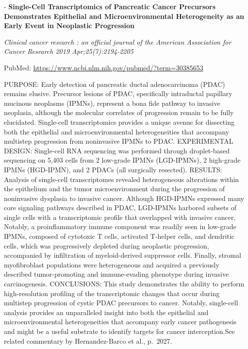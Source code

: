 \documentclass[]{article}
\begin{document}
 - \textbf{Single-Cell Transcriptomics of Pancreatic Cancer Precursors
Demonstrates Epithelial and Microenvironmental Heterogeneity as an Early
Event in Neoplastic Progression}

\emph{Clinical cancer research : an official journal of the American
Association for Cancer Research 2019 Apr;25(7):2194-2205}

PubMed: \url{https://www.ncbi.nlm.nih.gov/pubmed/?term=30385653}

PURPOSE: Early detection of pancreatic ductal adenocarcinoma (PDAC)
remains elusive. Precursor lesions of PDAC, specifically intraductal
papillary mucinous neoplasms (IPMNs), represent a bona fide pathway to
invasive neoplasia, although the molecular correlates of progression
remain to be fully elucidated. Single-cell transcriptomics provides a
unique avenue for dissecting both the epithelial and microenvironmental
heterogeneities that accompany multistep progression from noninvasive
IPMNs to PDAC. EXPERIMENTAL DESIGN: Single-cell RNA sequencing was
performed through droplet-based sequencing on 5,403 cells from 2
low-grade IPMNs (LGD-IPMNs), 2 high-grade IPMNs (HGD-IPMN), and 2 PDACs
(all surgically resected). RESULTS: Analysis of single-cell
transcriptomes revealed heterogeneous alterations within the epithelium
and the tumor microenvironment during the progression of noninvasive
dysplasia to invasive cancer. Although HGD-IPMNs expressed many core
signaling pathways described in PDAC, LGD-IPMNs harbored subsets of
single cells with a transcriptomic profile that overlapped with invasive
cancer. Notably, a proinflammatory immune component was readily seen in
low-grade IPMNs, composed of cytotoxic T cells, activated T-helper
cells, and dendritic cells, which was progressively depleted during
neoplastic progression, accompanied by infiltration of myeloid-derived
suppressor cells. Finally, stromal myofibroblast populations were
heterogeneous and acquired a previously described tumor-promoting and
immune-evading phenotype during invasive carcinogenesis. CONCLUSIONS:
This study demonstrates the ability to perform high-resolution profiling
of the transcriptomic changes that occur during multistep progression of
cystic PDAC precursors to cancer. Notably, single-cell analysis provides
an unparalleled insight into both the epithelial and microenvironmental
heterogeneities that accompany early cancer pathogenesis and might be a
useful substrate to identify targets for cancer interception.See related
commentary by Hernandez-Barco et al., p.~2027.
\end{document}

